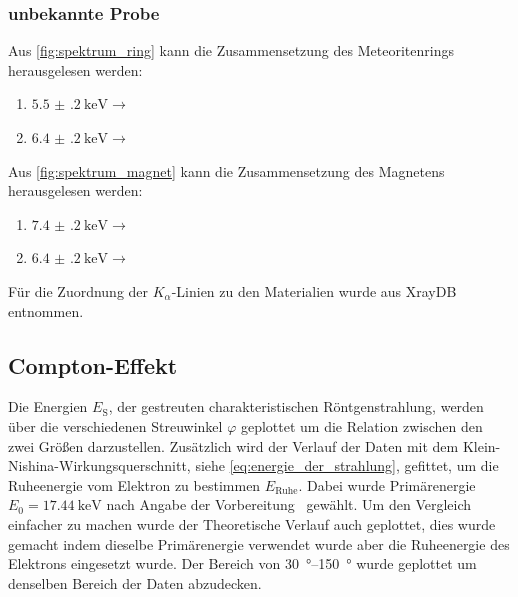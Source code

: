 \documentclass[12pt,english,ngerman]{scrartcl}
\begin{document}
\subsubsection{unbekannte Probe}

Aus \autoref{fig:spektrum_ring} kann die Zusammensetzung des Meteoritenrings
herausgelesen werden:

\begin{enumerate}
	\item $\SI{5.5(2)}{\kilo\eV} \rightarrow $ 
	\item $\SI{6.4(2)}{\kilo\eV} \rightarrow $ 
\end{enumerate}

Aus \autoref{fig:spektrum_magnet} kann die Zusammensetzung des Magnetens
herausgelesen werden:

\begin{enumerate}
	\item $\SI{7.4(2)}{\kilo\eV} \rightarrow $ 
	\item $\SI{6.4(2)}{\kilo\eV} \rightarrow $ 
\end{enumerate}

Für die Zuordnung der $K_\alpha$-Linien zu den Materialien wurde aus
XrayDB~\cite{newville_xraypyxraydb_2023} entnommen.

\subsection{Compton-Effekt}

Die Energien $E_\text{S}$, der gestreuten charakteristischen Röntgenstrahlung,
werden über die verschiedenen Streuwinkel $\varphi$ geplottet um die Relation
zwischen den zwei Größen darzustellen. Zusätzlich wird der Verlauf der Daten
mit dem Klein-Nishina-Wirkungsquerschnitt, siehe
\autoref{eq:energie_der_strahlung}, gefittet, um die Ruheenergie vom Elektron
zu bestimmen $E_\text{Ruhe}$. Dabei wurde Primärenergie
$E_0=\SI{17.44}{\kilo\electronvolt}$ nach Angabe der
Vorbereitung~\cite{koller_experimente_nodate-1} gewählt. Um den Vergleich
einfacher zu machen wurde der Theoretische Verlauf auch geplottet, dies wurde
gemacht indem dieselbe Primärenergie verwendet wurde aber die Ruheenergie des
Elektrons eingesetzt wurde. Der Bereich von \SIrange{30}{150}{\degree} wurde
geplottet um denselben Bereich der Daten abzudecken.
\end{document}
